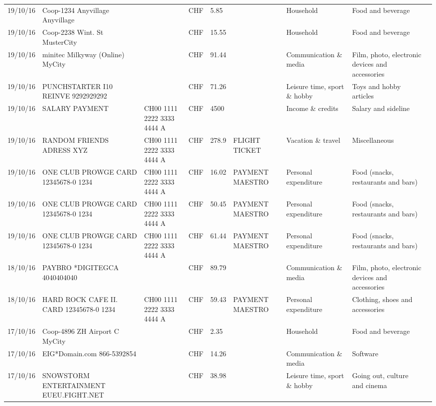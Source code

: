 \begin{landscape}
\begin{tiny}
\begin{longtable}{lp{4cm}llllp{3cm}ll}
		    19/10/16 & Coop-1234 Anyvillage    Anyvillage &       & CHF   & 5.85  &       & Household & Food and beverage \\
		    19/10/16 & Coop-2238 Wint. St       MusterCity &       & CHF   & 15.55 &       & Household & Food and beverage \\
		    19/10/16 & minitec Milkyway (Online) MyCity &       & CHF   & 91.44 &       & Communication \& media & Film, photo, electronic devices and accessories \\
		    19/10/16 & PUNCHSTARTER I10 REINVE   9292929292 &       & CHF   & 71.26 &       & Leisure time, sport \& hobby & Toys and hobby articles \\
		    19/10/16 & SALARY PAYMENT & CH00 1111 2222 3333 4444 A & CHF   & 4500  &       & Income \& credits & Salary and sideline \\
		    19/10/16 & RANDOM FRIENDS ADRESS XYZ & CH00 1111 2222 3333 4444 A & CHF   & 278.9 & FLIGHT TICKET & Vacation \& travel & Miscellaneous \\
		    19/10/16 & ONE CLUB PROWGE CARD 12345678-0 1234 & CH00 1111 2222 3333 4444 A & CHF   & 16.02 & PAYMENT MAESTRO & Personal expenditure & Food (snacks, restaurants and bars) \\
		    19/10/16 & ONE CLUB PROWGE CARD 12345678-0 1234 & CH00 1111 2222 3333 4444 A & CHF   & 50.45 & PAYMENT MAESTRO & Personal expenditure & Food (snacks, restaurants and bars) \\
		    19/10/16 & ONE CLUB PROWGE CARD 12345678-0 1234 & CH00 1111 2222 3333 4444 A & CHF   & 61.44 & PAYMENT MAESTRO & Personal expenditure & Food (snacks, restaurants and bars) \\
		    18/10/16 & PAYBRO *DIGITEGCA      4040404040 &       & CHF   & 89.79 &       & Communication \& media & Film, photo, electronic devices and accessories \\
		    18/10/16 & HARD ROCK CAFE II. CARD 12345678-0 1234 & CH00 1111 2222 3333 4444 A & CHF   & 59.43 & PAYMENT MAESTRO & Personal expenditure & Clothing, shoes and accessories \\
		    17/10/16 & Coop-4896 ZH Airport C   MyCity &       & CHF   & 2.35  &       & Household & Food and beverage \\
		    17/10/16 & EIG*Domain.com           866-5392854 &       & CHF   & 14.26 &       & Communication \& media & Software \\
		    17/10/16 & SNOWSTORM ENTERTAINMENT EUEU.FIGHT.NET &       & CHF   & 38.98 &       & Leisure time, sport \& hobby & Going out, culture and cinema \\

\end{longtable}
\end{tiny}
\end{landscape}
